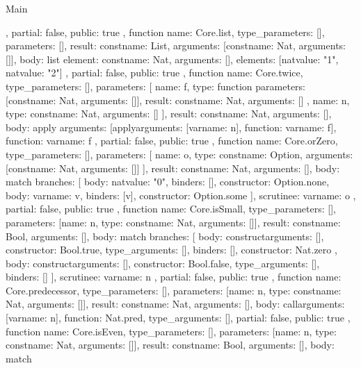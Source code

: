 \begin{lexlean}{Main}
\begin{toolingmodule}
{{{      },
      partial: false,
      public: true
    },
    function{
      name: Core.list,
      type_parameters: [],
      parameters: [],
      result: const{name: List, arguments: [const{name: Nat, arguments: []}]},
      body: list{
        element: const{name: Nat, arguments: []},
        elements: [nat{value: "1"}, nat{value: "2"}]
      },
      partial: false,
      public: true
    },
    function{
      name: Core.twice,
      type_parameters: [],
      parameters: [
        {
          name: f,
          type: function{
            parameters: [const{name: Nat, arguments: []}],
            result: const{name: Nat, arguments: []}
          }
        },
        {name: n, type: const{name: Nat, arguments: []}}
      ],
      result: const{name: Nat, arguments: []},
      body: apply{
        arguments: [apply{arguments: [var{name: n}], function: var{name: f}}],
        function: var{name: f}
      },
      partial: false,
      public: true
    },
    function{
      name: Core.orZero,
      type_parameters: [],
      parameters: [
        {name: o, type: const{name: Option, arguments: [const{name: Nat, arguments: []}]}}
      ],
      result: const{name: Nat, arguments: []},
      body: match{
        branches: [
          {body: nat{value: "0"}, binders: [], constructor: Option.none},
          {body: var{name: v}, binders: [v], constructor: Option.some}
        ],
        scrutinee: var{name: o}
      },
      partial: false,
      public: true
    },
    function{
      name: Core.isSmall,
      type_parameters: [],
      parameters: [{name: n, type: const{name: Nat, arguments: []}}],
      result: const{name: Bool, arguments: []},
      body: match{
        branches: [
          {
            body: construct{arguments: [], constructor: Bool.true, type_arguments: []},
            binders: [],
            constructor: Nat.zero
          },
          {body: construct{arguments: [], constructor: Bool.false, type_arguments: []}, binders: []}
        ],
        scrutinee: var{name: n}
      },
      partial: false,
      public: true
    },
    function{
      name: Core.predecessor,
      type_parameters: [],
      parameters: [{name: n, type: const{name: Nat, arguments: []}}],
      result: const{name: Nat, arguments: []},
      body: call{arguments: [var{name: n}], function: Nat.pred, type_arguments: []},
      partial: false,
      public: true
    },
    function{
      name: Core.isEven,
      type_parameters: [],
      parameters: [{name: n, type: const{name: Nat, arguments: []}}],
      result: const{name: Bool, arguments: []},
      body: match{
}}}
\end{toolingmodule}
\end{lexlean}
